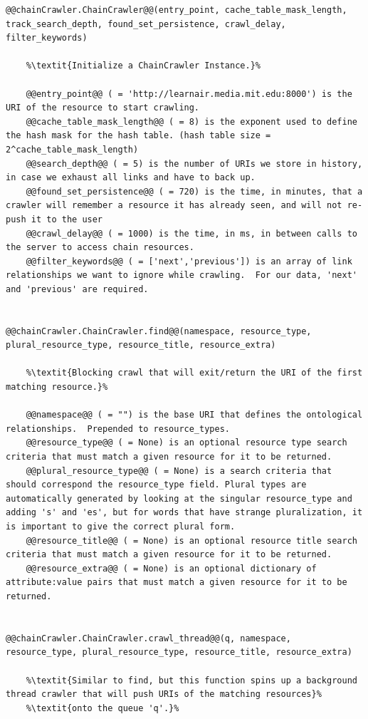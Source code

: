\begin{lstlisting}[style=codedef]
@@chainCrawler.ChainCrawler@@(entry_point, cache_table_mask_length, track_search_depth, found_set_persistence, crawl_delay, filter_keywords)
	
	%\textit{Initialize a ChainCrawler Instance.}%

	@@entry_point@@ ( = 'http://learnair.media.mit.edu:8000') is the URI of the resource to start crawling.
	@@cache_table_mask_length@@ ( = 8) is the exponent used to define the hash mask for the hash table. (hash table size = 2^cache_table_mask_length)
	@@search_depth@@ ( = 5) is the number of URIs we store in history, in case we exhaust all links and have to back up.
	@@found_set_persistence@@ ( = 720) is the time, in minutes, that a crawler will remember a resource it has already seen, and will not re-push it to the user 
	@@crawl_delay@@ ( = 1000) is the time, in ms, in between calls to the server to access chain resources.
	@@filter_keywords@@ ( = ['next','previous']) is an array of link relationships we want to ignore while crawling.  For our data, 'next' and 'previous' are required.


@@chainCrawler.ChainCrawler.find@@(namespace, resource_type, plural_resource_type, resource_title, resource_extra)
	
	%\textit{Blocking crawl that will exit/return the URI of the first matching resource.}%

	@@namespace@@ ( = "") is the base URI that defines the ontological relationships.  Prepended to resource_types. 
	@@resource_type@@ ( = None) is an optional resource type search criteria that must match a given resource for it to be returned.
	@@plural_resource_type@@ ( = None) is a search criteria that should correspond the resource_type field. Plural types are automatically generated by looking at the singular resource_type and adding 's' and 'es', but for words that have strange pluralization, it is important to give the correct plural form. 
	@@resource_title@@ ( = None) is an optional resource title search criteria that must match a given resource for it to be returned.
	@@resource_extra@@ ( = None) is an optional dictionary of attribute:value pairs that must match a given resource for it to be returned.


@@chainCrawler.ChainCrawler.crawl_thread@@(q, namespace, resource_type, plural_resource_type, resource_title, resource_extra)
	
	%\textit{Similar to find, but this function spins up a background thread crawler that will push URIs of the matching resources}% 
	%\textit{onto the queue 'q'.}%


\end{lstlisting}
